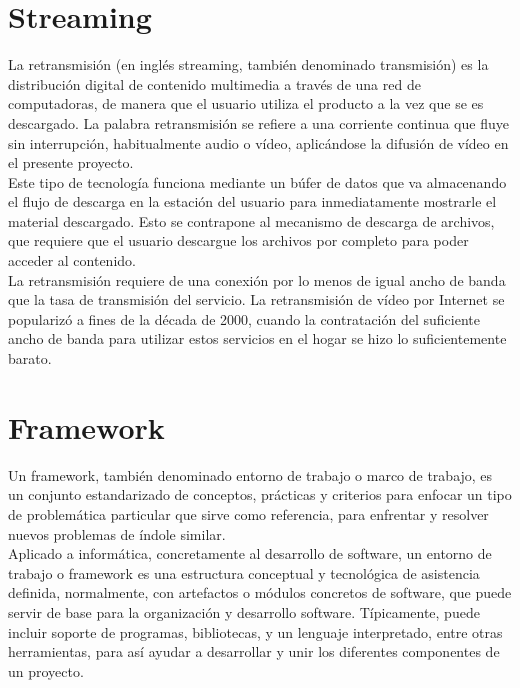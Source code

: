 \section{Streaming}
\label{sec:def-streaming}


La retransmisión (en inglés streaming, también denominado transmisión) es la distribución digital de contenido multimedia a través de una red de computadoras, 
de manera que el usuario utiliza el producto a la vez que se es descargado. La palabra retransmisión se refiere a una corriente continua que fluye sin interrupción, habitualmente audio o vídeo, aplicándose la difusión 
de vídeo en el presente proyecto. \\

Este tipo de tecnología funciona mediante un búfer de datos que va almacenando el flujo de descarga en la estación del usuario para inmediatamente mostrarle el material descargado. Esto se contrapone al mecanismo de
descarga de archivos, que requiere que el usuario descargue los archivos por completo para poder acceder al contenido.\\

La retransmisión requiere de una conexión por lo menos de igual ancho de banda que la tasa de transmisión del servicio. La retransmisión de vídeo por Internet se popularizó a fines de la década de 2000, 
cuando la contratación del suficiente ancho de banda para utilizar estos servicios en el hogar se hizo lo suficientemente barato.



\section{Framework}
\label{sec:def-Framework}

Un framework, también denominado entorno de trabajo o marco de trabajo, es un conjunto estandarizado de conceptos, prácticas y criterios para enfocar un tipo de problemática particular que sirve como
referencia, para enfrentar y resolver nuevos problemas de índole similar.\\

Aplicado a informática, concretamente al desarrollo de software, un entorno de trabajo o framework es una estructura conceptual y tecnológica de asistencia definida, normalmente, con artefactos o 
módulos concretos de software, que puede servir de base para la organización y desarrollo software. Típicamente, puede incluir soporte de programas, bibliotecas, y un lenguaje interpretado, entre 
otras herramientas, para así ayudar a desarrollar y unir los diferentes componentes de un proyecto.\\

